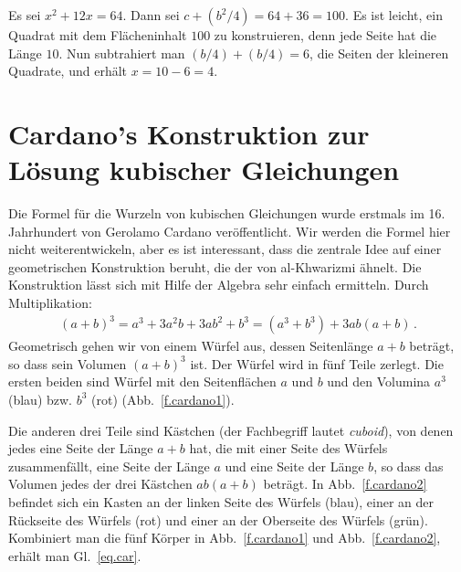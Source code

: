 \begin{example}
Es sei $x^2+12x=64$. Dann sei $c+(b^2/4)=64+36=100$. Es ist leicht, ein Quadrat mit dem Flächeninhalt $100$ zu konstruieren, denn jede Seite hat die Länge $10$. Nun subtrahiert man $(b/4)+(b/4)=6$, die Seiten der kleineren Quadrate, und erhält $x=10-6=4$.
\end{example}

\section{Cardano's Konstruktion zur Lösung kubischer Gleichungen}\label{s.cardano}

Die Formel für die Wurzeln von kubischen Gleichungen wurde erstmals im 16. Jahrhundert von Gerolamo Cardano veröffentlicht. Wir werden die Formel hier nicht weiterentwickeln, aber es ist interessant, dass die zentrale Idee auf einer geometrischen Konstruktion beruht, die der von al-Khwarizmi ähnelt. Die Konstruktion lässt sich mit Hilfe der Algebra sehr einfach ermitteln. Durch Multiplikation:
\begin{align}\label{eq.car}
(a+b)^3=a^3+3a^2b+3ab^2+b^3=(a^3+b^3)+3ab(a+b)\,.
\end{align}
Geometrisch gehen wir von einem Würfel aus, dessen Seitenlänge $a+b$ beträgt, so dass sein Volumen $(a+b)^3$ ist. Der Würfel wird in fünf Teile zerlegt. Die ersten beiden sind Würfel mit den Seitenflächen $a$ und $b$ und den Volumina $a^3$ (blau) bzw. $b^3$ (rot) (Abb.~\ref{f.cardano1}).

Die anderen drei Teile sind Kästchen (der Fachbegriff lautet \emph{cuboid}), von denen jedes eine Seite der Länge $a+b$ hat, die mit einer Seite des Würfels zusammenfällt, eine Seite der Länge $a$ und eine Seite der Länge $b$, so dass das Volumen jedes der drei Kästchen $ab(a+b)$ beträgt. In Abb.~\ref{f.cardano2} befindet sich ein Kasten an der linken Seite des Würfels (blau), einer an der Rückseite des Würfels (rot) und einer an der Oberseite des Würfels (grün).
Kombiniert man die fünf Körper in Abb.~\ref{f.cardano1} und Abb.~\ref{f.cardano2}, erhält man Gl.~\ref{eq.car}.


